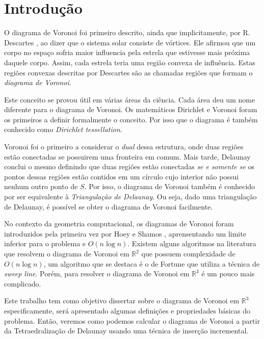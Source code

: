 \section{Introdução}

O diagrama de Voronoi foi primeiro descrito, ainda que implicitamente, por 
R. Descartes \cite{descartesPP}, ao dizer que o sistema solar consiste de vórtices.
Ele afirmou que um corpo no espaço sofria maior influencia pela estrela que estivesse
mais próxima daquele corpo. Assim, cada estrela teria uma região convexa de influência.
Estas regiões convexas descritas por Descartes são as chamadas regiões que formam
o \textit{diagrama de Voronoi}. 

Este conceito se provou útil em várias áreas da ciência. Cada área deu um nome
diferente para o diagrama de Voronoi. Os matemáticos Dirichlet \cite{LejeuneDirichlet1850} 
e Voronoi \cite{Voronoi1909} foram os primeiros a definir formalmente o conceito.
Por isso que o diagrama é também conhecido como \textit{Dirichlet tessellation}.

Voronoi foi o primeiro a considerar o \textit{dual} dessa estrutura, onde duas 
regiões estão conectadas se possuirem uma fronteira em comum. Mais tarde, Delaunay
\cite{Delaunay1934} conclui o mesmo definindo que duas regiões estão conectadas
\textit{se e somente se} os pontos dessas regiões estão contidos em um círculo
cujo interior não possui nenhum outro ponto de $S$. Por isso, o diagrama de Voronoi
também é conhecido por ser equivalente à \textit{Triangulação de Delaunay}.
Ou seja, dado uma triangulação de Delaunay, é possível se obter o diagrama
de Voronoi facilmente.

No contexto da geometria computacional, os diagramas de Voronoi foram introduzidos
pela primeira vez por Hoey e Shamos \cite{ShamosHoey1975}, aprensentando um 
limite inferior para o problema e $O(n\log n)$. Existem alguns algoritmos na literatura
que resolvem o diagrama de Voronoi em $\mathbb{R}^2$ que possuem complexidade de $O(n\log n)$, 
um algoritmo que se destaca é o de Fortune \cite{Fortune1986} que 
utiliza a técnica de \textit{sweep line}. Porém, para resolver o diagrama de Voronoi em 
$\mathbb{R}^3$ é um pouco mais complicado. 

Este trabalho tem como objetivo dissertar sobre o diagrama de Voronoi em $\mathbb{R}^3$
especificamente, será apresentado algumas definições e propriedades básicas do problema.
Então, veremos como podemos calcular o diagrama de Voronoi a partir da Tetraedralização 
de Delaunay usando uma técnica de inserção incremental.
